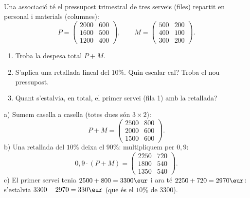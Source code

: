 \begin{exresolt}
Una associació té el pressupost trimestral de tres serveis (files) repartit en
personal i materials (columnes):
\[
P=\begin{pmatrix} 2000 & 600 \\ 1600 & 500 \\ 1200 & 400 \end{pmatrix},\qquad
M=\begin{pmatrix} 500 & 200 \\ 400 & 100 \\ 300 & 200 \end{pmatrix}.
\]
\begin{enumerate}[label=\alph*), leftmargin=1.6em, topsep=2pt]
  \item Troba la despesa total $P+M$.
  \item S'aplica una retallada lineal del $10\%$. Quin escalar cal? Troba el nou
        pressupost.
  \item Quant s'estalvia, en total, el primer servei (fila 1) amb la retallada?
\end{enumerate}
\solucio
a) Sumem casella a casella (totes dues són $3\times 2$):
\[
P+M=\begin{pmatrix} 2500 & 800 \\ 2000 & 600 \\ 1500 & 600 \end{pmatrix}.
\]
b) Una retallada del $10\%$ deixa el $90\%$: multipliquem per $0{,}9$:
\[
0{,}9\cdot(P+M)=\begin{pmatrix} 2250 & 720 \\ 1800 & 540 \\ 1350 & 540 \end{pmatrix}.
\]
c) El primer servei tenia $2500+800=3300\eur$ i ara té $2250+720=2970\eur$:
s'estalvia $3300-2970=330\eur$ (que és el $10\%$ de $3300$).
\end{exresolt}

